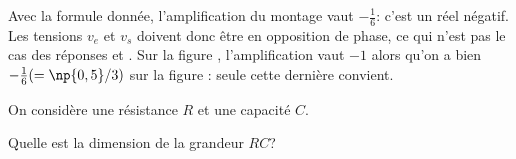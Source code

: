 

\reponse{\reponseC{}}

\begin{corrige}
 Avec la formule donnée, l’amplification du montage vaut \(-\frac{1}{6}\): c’est un réel négatif. Les tensions \(v_{e}\) et \(v_{s}\) doivent donc être en opposition de phase, ce qui n’est pas le cas des réponses \reponseA{} et \reponseD{}. Sur la figure \reponseB{}, l’amplification vaut $-1$ alors qu’on a bien \(-\frac{1}{6} (=\np{0,5}/3)\) sur la figure \reponseC{}: seule cette dernière convient.
\end{corrige}

\finEntrainement



\newpage




\hauteurLargeurCadreReponse		{8mm}{3.5cm}
\typeEntrainement				{} %
\initialisationEntrainement

\debutEntrainement


\begin{enonce}
On considère une résistance $R$ et une capacité $C$.

Quelle est la dimension de la grandeur \(RC\)?
\end{enonce}


